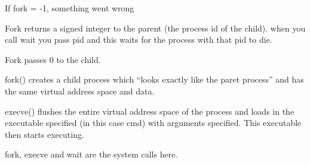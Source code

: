 \documentclass[10pt,\jkfside,a4paper]{article}
\begin{document}
If fork = -1, something went wrong

Fork returns a signed integer to the parent (the process id of the child). when you call 
wait you pass pid and this waits for the process with that pid to die.

Fork passes 0 to the child.

fork() creates a child process which ``looks exactly like the paret process'' and has the same 
virtual address space and data.

execve() flushes the entire virtual address space of the process and loads in the executable 
specified (in this case cmd) with arguments specified. This executable then starts executing.

fork, execve and wait are the system calls here.
\end{document}
